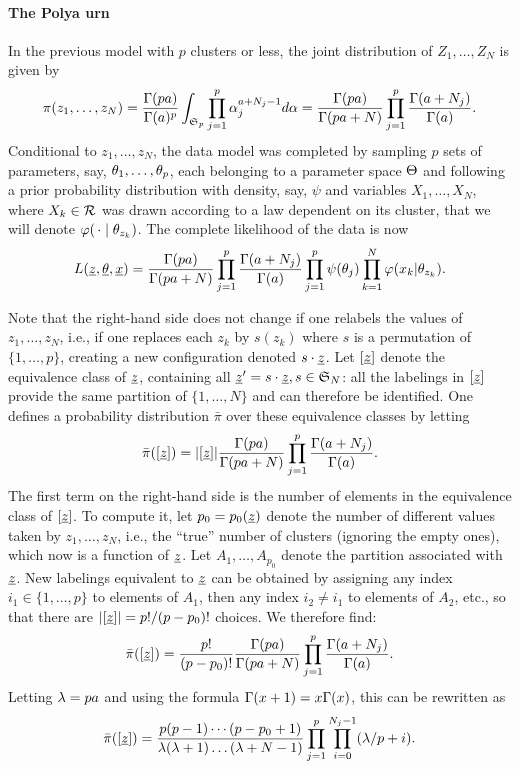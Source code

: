 \paragraph{The Polya urn}
In the previous model with $p$ clusters or less, the joint distribution of $Z_1, \ldots, Z_N$ is given by
\[
\pi(z_1, \ldots, z_N) = \frac{\Gamma(pa)}{\Gamma(a)^p} \int_{\mathfrak S_p} \prod_{j=1}^p \alpha_j^{a+N_j -1} d\alpha = \frac{\Gamma(pa)}{\Gamma(pa+N)} \prod_{j=1}^p \frac{\Gamma(a+N_j)}{\Gamma(a)}.
\]
Conditional to $z_1, \ldots, z_N$, the data model was completed by sampling $p$ sets of parameters, say, $\theta_1, \ldots, \theta_p$, each belonging to a parameter space $\Theta$  and following a prior probability distribution with density, say, $\psi$ and variables $X_1, \ldots, X_N$, where $X_k\in {\mathcal R}$ was drawn according to a law dependent on its cluster, that we will denote $\varphi(\,\cdot\mid\theta_{z_k})$. The complete likelihood of the data is now
\[
L({\underline{z}}, \underline{\theta}, {\underline{x}}) = \frac{\Gamma(pa)}{\Gamma(pa+N)} \prod_{j=1}^p \frac{\Gamma(a+N_j)}{\Gamma(a)} \prod_{j=1}^p \psi(\theta_j) \prod_{k=1}^N \varphi(x_k|\theta_{z_k}).
\]


Note that the right-hand side does not change if one relabels the values of $z_1, \ldots, z_N$, i.e., if one replaces each $z_k$ by $s(z_k)$ where $s$ is a permutation of $\{1, \ldots, p\}$, creating a new configuration denoted $s\cdot {\underline{z}}$. Let $[{\underline{z}}]$ denote the equivalence class of ${\underline{z}}$, containing all ${\underline{z}}' = s \cdot {\underline{z}}, s\in \mathfrak S_N$: all the labelings in $[{\underline{z}}]$ provide the same partition of $\{1, \ldots, N\}$ and can therefore be identified. One defines a probability distribution $\bar\pi$ over these equivalence classes by letting
\[
\bar \pi([{\underline{z}}]) = |[{\underline{z}}]|\frac{\Gamma(pa)}{\Gamma(pa+N)} \prod_{j=1}^p \frac{\Gamma(a+N_j)}{\Gamma(a)}.
\]
The first term on the right-hand side is  the number of elements in the equivalence class of $[{\underline{z}}]$. To compute it, 
let $p_0 = p_0({\underline{z}})$ denote the number of different values  taken by $z_1, \ldots, z_N$, i.e., the ``true'' number of  clusters (ignoring the empty ones), which now is a function of ${\underline{z}}$. Let $A_1, \ldots, A_{p_0}$ denote the partition associated with ${\underline{z}}$.  New labelings equivalent to ${\underline{z}}$ can be obtained by assigning any index $i_1\in \{1, \ldots, p\}$ to elements of $A_1$, then any index $i_2\neq i_1$ to elements of $A_2$, etc., so that there are  $|[{\underline{z}}]| = p!/(p-p_0)!$ choices. We therefore find:
\[
\bar \pi([{\underline{z}}]) = \frac{p!}{(p-p_0)!} \frac{\Gamma(pa)}{\Gamma(pa+N)} \prod_{j=1}^p \frac{\Gamma(a+N_j)}{\Gamma(a)}.
\]
Letting $\lambda = pa$ and using the formula $\Gamma(x+1) = x\Gamma(x)$, this can be rewritten as
\[
\bar \pi([{\underline{z}}]) = \frac{p(p-1)\cdots(p-p_0+1)}{\lambda (\lambda+1) \ldots (\lambda+N-1)} \prod_{j=1}^p \prod_{i=0}^{N_j-1} (\lambda/p+i).
\]

